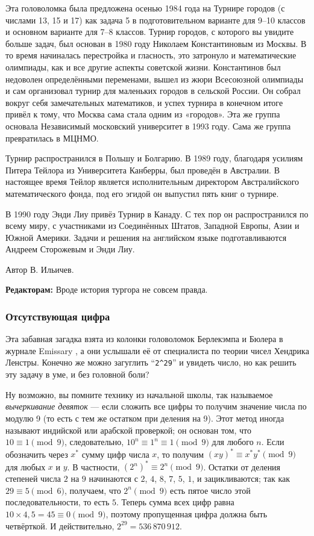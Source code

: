 Эта головоломка была предложена осенью 1984 года на Турнире городов (с числами 13, 15 и 17) как задача 5 в подготовительном варианте для 9--10 классов и основном варианте для 7--8 классов.
Турнир городов, с которого вы увидите больше задач, был основан в 1980 году Николаем Константиновым из Москвы.
В то время начиналась перестройка и гласность, это затронуло и математические олимпиады, как и все другие аспекты советской жизни.
Константинов был недоволен определёнными переменами, вышел из жюри Всесоюзной олимпиады и сам организовал турнир для маленьких городов в сельской России.
Он собрал вокруг себя замечательных математиков, и успех турнира в конечном итоге привёл к тому, что Москва сама стала одним из «городов».
Эта же группа основала Независимый московский университет в 1993 году.
Сама же группа превратилась в МЦНМО.

Турнир распространился в Польшу и Болгарию.
В 1989 году, благодаря усилиям Питера Тейлора из Университета Канберры, был проведён в Австралии.
В настоящее время Тейлор является исполнительным директором Австралийского математического фонда, под его эгидой он выпустил пять книг о турнире.

В 1990 году Энди Лиу привёз Турнир в Канаду.
С тех пор он распространился по всему миру, с участниками из Соединённых Штатов, Западной Европы, Азии и Южной Америки.
Задачи и решения на английском языке подготавливаются Андреем Сторожевым и Энди Лиу.

\begin{addedbytheeditors}
Автор В. Ильичев.

\textbf{Редакторам:} Вроде история тургора не совсем правда.
\end{addedbytheeditors}

\subsubsection*{Отсутствующая цифра}

Эта забавная загадка взята из колонки головоломок Берлекэмпа и Бюлера в журнале Emissary \cite[весна/осень 2006 года]{3},
а они услышали её от специалиста по теории чисел Хендрика Ленстры.
Конечно же можно загуглить ``\texttt{2\^{}29}'' и увидеть число, но как решить эту задачу в уме, и без головной боли?

Ну возможно, вы помните технику из начальной школы, так называемое \emph{вычеркивание девяток} --- если сложить все цифры то получим значение числа по модулю 9 (то есть  с тем же остатком при деления на 9).
Этот метод иногда называют индийской или арабской проверкой;
он основан том, что $10 \equiv 1 \pmod 9$, следовательно, $10^n \equiv 1^n \equiv 1 \pmod 9$ для любого $n$.
Если обозначить через $x^*$ сумму цифр числа $x$, то получим $(xy)^* \equiv x^* y^* \pmod 9$ для любых $x$ и $y$.
В частности, $(2^n)^* \equiv 2^n \pmod 9$.
Остатки от деления степеней числа $2$ на $9$ начинаются с $2$, $4$, $8$, $7$, $5$, $1$, и зацикливаются;
так как $29 \equiv 5 \pmod 6$, получаем, что $2^n \pmod 9$ есть пятое число этой последовательности, то есть $5$.
Теперь сумма всех цифр равна $10 \times 4{,}5 = 45 \equiv 0 \pmod 9$, поэтому пропущенная цифра должна быть четвёрткой.
И действительно, $2^{29} = 536\,870\,912$.

